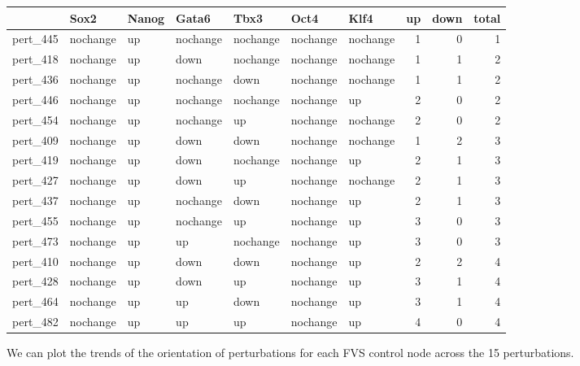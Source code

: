 \documentclass[
]{book}
\begin{document}
\begin{tabular}{l|l|l|l|l|l|l||>{}r|r|r}
\hline
  & Sox2 & Nanog & Gata6 & Tbx3 & Oct4 & Klf4 & up & down & total\\
\hline
pert\_445 & nochange & up & nochange & nochange & nochange & nochange & 1 & 0 & 1\\
\hline
pert\_418 & nochange & up & down & nochange & nochange & nochange & 1 & 1 & 2\\
\hline
pert\_436 & nochange & up & nochange & down & nochange & nochange & 1 & 1 & 2\\
\hline
pert\_446 & nochange & up & nochange & nochange & nochange & up & 2 & 0 & 2\\
\hline
pert\_454 & nochange & up & nochange & up & nochange & nochange & 2 & 0 & 2\\
\hline
pert\_409 & nochange & up & down & down & nochange & nochange & 1 & 2 & 3\\
\hline
pert\_419 & nochange & up & down & nochange & nochange & up & 2 & 1 & 3\\
\hline
pert\_427 & nochange & up & down & up & nochange & nochange & 2 & 1 & 3\\
\hline
pert\_437 & nochange & up & nochange & down & nochange & up & 2 & 1 & 3\\
\hline
pert\_455 & nochange & up & nochange & up & nochange & up & 3 & 0 & 3\\
\hline
pert\_473 & nochange & up & up & nochange & nochange & up & 3 & 0 & 3\\
\hline
pert\_410 & nochange & up & down & down & nochange & up & 2 & 2 & 4\\
\hline
pert\_428 & nochange & up & down & up & nochange & up & 3 & 1 & 4\\
\hline
pert\_464 & nochange & up & up & down & nochange & up & 3 & 1 & 4\\
\hline
pert\_482 & nochange & up & up & up & nochange & up & 4 & 0 & 4\\
\hline
\end{tabular}

We can plot the trends of the orientation of perturbations for each FVS control node across the 15 perturbations.
\end{document}
